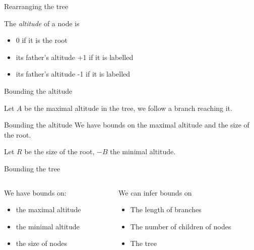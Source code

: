 \documentclass{beamer}
\begin{document}
\begin{frame}{Rearranging the tree}
	\begin{definition}
		The \emph{altitude} of a node is 
		
		\begin{itemize}
			\item 0 if it is the root
			
			\item its father's altitude +1 if it is labelled 
		
			\item its father's altitude -1 if it is labelled 
		\end{itemize}
	\end{definition}
\end{frame}

\begin{frame}{Bounding the altitude}
	
	Let $A$ be the maximal altitude in the tree, we follow a branch reaching it. 
	
	
	
\end{frame}

\begin{frame}{Bounding the altitude}
	We have bounds on the maximal altitude and the size of the root.
	
	Let $R$ be the size of the root, $-B$ the minimal altitude.
	
	
\end{frame}

\begin{frame}{Bounding the tree}
	
	\begin{columns}
		\begin{column}{0.5\textwidth}
			We have bounds on:
			
			\begin{itemize}
				\item the maximal altitude
				
				\item the minimal altitude
				
				\item the size of nodes
			\end{itemize}
		\end{column}
		
		\begin{column}{0.5\textwidth}
			\pause
			We can infer bounds on 
			
			\begin{itemize}
				\item The length of branches
				
				\item The number of children of nodes
				
				\item The tree
			\end{itemize}
			
		\end{column}
	\end{columns}
	
	\end{frame}
\end{document}
